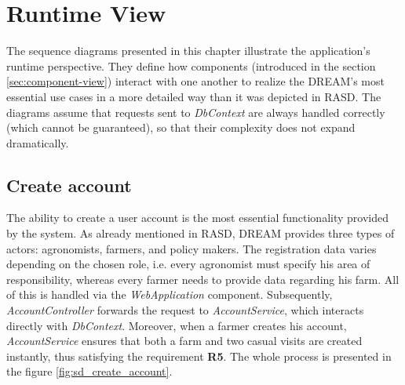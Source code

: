 \section{Runtime View}

The sequence diagrams presented in this chapter illustrate the application's runtime perspective. They define how components (introduced in the section \ref{sec:component-view}) interact with one another to realize the DREAM's most essential use cases in a more detailed way than it was depicted in RASD. The diagrams assume that requests sent to \textit{DbContext} are always handled correctly (which cannot be guaranteed), so that their complexity does not expand dramatically.

\subsection*{Create account}

The ability to create a user account is the most essential functionality provided by the system. As already mentioned in RASD, DREAM provides three types of actors: agronomists, farmers, and policy makers. The registration data varies depending on the chosen role, i.e. every agronomist must specify his area of responsibility, whereas every farmer needs to provide data regarding his farm. All of this is handled via the \textit{WebApplication} component. Subsequently, \textit{AccountController} forwards the request to \textit{AccountService}, which interacts directly with \textit{DbContext}. Moreover, when a farmer creates his account, \textit{AccountService} ensures that both a farm and two casual visits are created instantly, thus satisfying the requirement \textbf{R5}. The whole process is presented in the figure \ref{fig:sd_create_account}.

